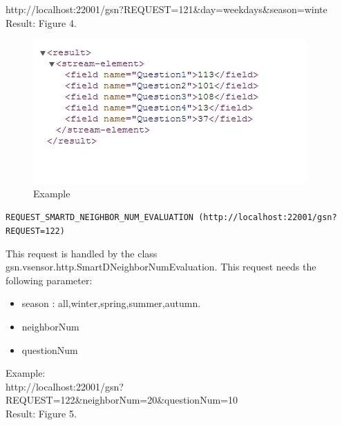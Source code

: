\documentclass[12pt]{article}
\begin{document}
http://localhost:22001/gsn?REQUEST=121\&day=weekdays\&season=winte\\

Result: Figure 4.

\begin{figure}
		\centering
			\includegraphics{REQUEST_SMARTD_QUESTION_SELECTION.JPG}
		\caption{Example}
\end{figure}


\vspace{1cm}

\texttt{REQUEST\_SMARTD\_NEIGHBOR\_NUM\_EVALUATION (http://localhost:22001/gsn?REQUEST=122)}

\vspace{0.5cm}

This request is handled by the class gsn.vsensor.http.SmartDNeighborNumEvaluation.  This request needs the following parameter: 

\begin{itemize}
  \item season : all,winter,spring,summer,autumn.
  \item neighborNum 
  \item questionNum
\end{itemize}
      
Example:  \\
  
http://localhost:22001/gsn?REQUEST=122\&neighborNum=20\&questionNum=10\\

Result: Figure 5.
\end{document}
